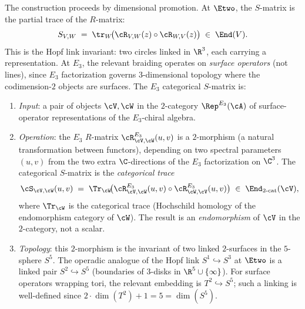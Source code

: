 \begin{construction}
\label{constr:e3-s-matrix}
The construction proceeds by dimensional promotion. At $\Etwo$, the
$S$-matrix is the partial trace of the $R$-matrix:
\[
 S_{V,W} \;=\; \tr_W\!\bigl(\cR_{V,W}(z) \circ \cR_{W,V}(z)\bigr)
 \;\in\; \End(V).
\]
This is the Hopf link invariant: two circles linked in $\R^3$, each
carrying a representation. At $E_3$, the relevant braiding operates on
\emph{surface operators} (not lines), since $E_3$ factorization governs
$3$-dimensional topology where the codimension-$2$ objects are surfaces.
The $E_3$ categorical $S$-matrix is:
\begin{enumerate}[label=\textup{(\roman*)}]
 \item \emph{Input}: a pair of objects $\cV, \cW$ in the $2$-category
 $\Rep^{E_3}(\cA)$ of surface-operator representations of the
 $E_3$-chiral algebra.
 \item \emph{Operation}: the $E_3$ $R$-matrix
 $\cR^{E_3}_{\cV,\cW}(u,v)$ is a $2$-morphism (a natural
 transformation between functors), depending on two spectral
 parameters $(u,v)$ from the two extra $\C$-directions of the
 $E_3$ factorization on $\C^3$. The categorical $S$-matrix is
 the \emph{categorical trace}
 \[
 \cS_{\cV,\cW}(u,v)
 \;=\;
 \Tr_{\cW}\!\bigl(
 \cR^{E_3}_{\cV,\cW}(u,v) \circ \cR^{E_3}_{\cW,\cV}(u,v)
 \bigr)
 \;\in\; \End_{\mathrm{2\text{-}cat}}(\cV),
 \]
 where $\Tr_{\cW}$ is the categorical trace (Hochschild homology of
 the endomorphism category of $\cW$). The result is an
 \emph{endomorphism} of $\cV$ in the $2$-category, not a scalar.
 \item \emph{Topology}: this $2$-morphism is the invariant of two
 linked $2$-surfaces in the $5$-sphere $S^5$. The operadic
 analogue of the Hopf link $S^1 \hookrightarrow S^3$ at
 $\Etwo$ is a linked pair $S^2 \hookrightarrow S^5$ (boundaries
 of $3$-disks in $\R^5 \cup \{\infty\}$). For surface
 operators wrapping tori, the relevant embedding is
 $T^2 \hookrightarrow S^5$; such a linking is well-defined
 since $2 \cdot \dim(T^2) + 1 = 5 = \dim(S^5)$.
\end{enumerate}
\end{construction}

